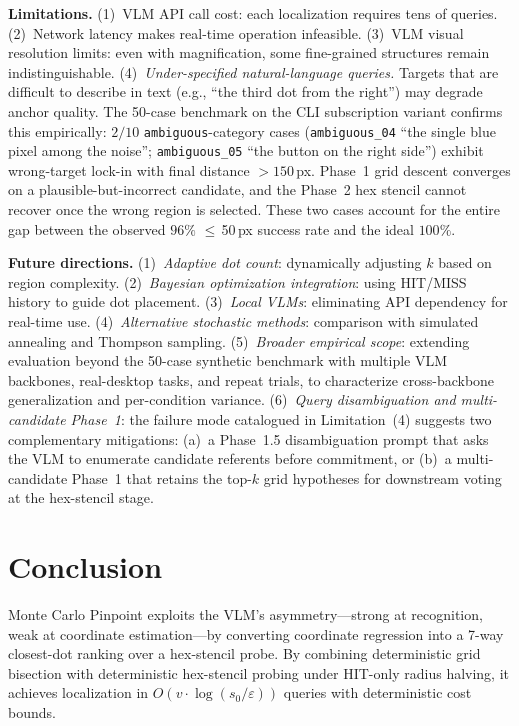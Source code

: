 \documentclass[sigconf,nonacm]{acmart}
\begin{document}
\textbf{Limitations.}
(1)~VLM API call cost: each localization requires tens of queries.
(2)~Network latency makes real-time operation infeasible.
(3)~VLM visual resolution limits: even with magnification, some
fine-grained structures remain indistinguishable.
(4)~\emph{Under-specified natural-language queries.}
Targets that are difficult to describe in text (e.g., ``the third
dot from the right'') may degrade anchor quality.  The
50-case benchmark on the CLI subscription variant confirms this
empirically: $2/10$ \texttt{ambiguous}-category cases
(\texttt{ambiguous\_04} ``the single blue pixel among the noise'';
\texttt{ambiguous\_05} ``the button on the right side'') exhibit
wrong-target lock-in with final distance $>\!150$\,px.  Phase~1
grid descent converges on a plausible-but-incorrect candidate, and
the Phase~2 hex stencil cannot recover once the wrong region is
selected.  These two cases account for the entire gap between the
observed $96\%$ $\leq$\,50\,px success rate and the ideal $100\%$.

\textbf{Future directions.}
(1)~\emph{Adaptive dot count}: dynamically adjusting $k$ based on
region complexity.
(2)~\emph{Bayesian optimization integration}: using HIT/MISS history
to guide dot placement.
(3)~\emph{Local VLMs}: eliminating API dependency for real-time use.
(4)~\emph{Alternative stochastic methods}: comparison with simulated
annealing and Thompson sampling.
(5)~\emph{Broader empirical scope}: extending evaluation beyond the
50-case synthetic benchmark with multiple VLM backbones, real-desktop
tasks, and repeat trials, to characterize cross-backbone
generalization and per-condition variance.
(6)~\emph{Query disambiguation and multi-candidate Phase~1}: the
failure mode catalogued in Limitation~(4) suggests two
complementary mitigations: (a)~a Phase~1.5 disambiguation prompt
that asks the VLM to enumerate candidate referents before
commitment, or (b)~a multi-candidate Phase~1 that retains the
top-$k$ grid hypotheses for downstream voting at the hex-stencil
stage.


\section{Conclusion}

Monte Carlo Pinpoint exploits the VLM's asymmetry---strong at
recognition, weak at coordinate estimation---by converting coordinate
regression into a 7-way closest-dot ranking over a hex-stencil
probe.  By combining deterministic grid bisection with deterministic
hex-stencil probing under HIT-only radius halving, it achieves
localization in $O(v \cdot \log(s_0/\varepsilon))$ queries with
deterministic cost bounds.
\end{document}
